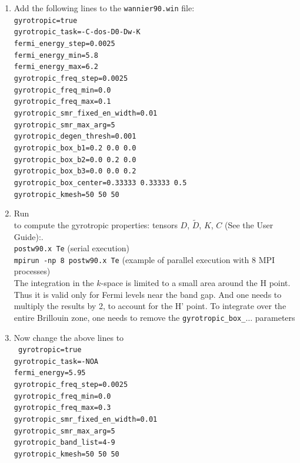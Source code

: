 \documentclass[a4paper,11pt,twoside]{article}
\begin{document}
\begin{enumerate}
\item  Add the following lines to the {\tt wannier90.win} file:\\
{\tt gyrotropic=true  \\
gyrotropic\_task=-C-dos-D0-Dw-K \\
fermi\_energy\_step=0.0025\\
fermi\_energy\_min=5.8\\
fermi\_energy\_max=6.2\\
gyrotropic\_freq\_step=0.0025\\
gyrotropic\_freq\_min=0.0\\
gyrotropic\_freq\_max=0.1\\
gyrotropic\_smr\_fixed\_en\_width=0.01\\
gyrotropic\_smr\_max\_arg=5\\
gyrotropic\_degen\_thresh=0.001\\
gyrotropic\_box\_b1=0.2 0.0 0.0\\
gyrotropic\_box\_b2=0.0 0.2 0.0\\
gyrotropic\_box\_b3=0.0 0.0 0.2\\
gyrotropic\_box\_center=0.33333 0.33333 0.5\\
gyrotropic\_kmesh=50 50 50
}



\item Run \postw\ \\to compute the gyrotropic properties: tensors $D$, $\widetilde{D}$, $K$, $C$ (See the User Guide):.\\
  {\tt postw90.x Te} (serial execution)\\
  {\tt mpirun -np 8 postw90.x Te} (example of parallel execution with
  8 MPI processes) \\


The integration in the $k$-space is limited to a small area around the H point. Thus it is valid only for Fermi levels near the band gap. 
And one needs to multiply the results by 2, to account for the H' point. To integrate over the entire Brillouin zone, one needs to remove the 
{\tt gyrotropic\_box\_$\ldots$} parameters

\item Now change the above lines to \\ {\tt
gyrotropic=true\\
gyrotropic\_task=-NOA\\
fermi\_energy=5.95\\
gyrotropic\_freq\_step=0.0025\\
gyrotropic\_freq\_min=0.0\\
gyrotropic\_freq\_max=0.3\\
gyrotropic\_smr\_fixed\_en\_width=0.01\\
gyrotropic\_smr\_max\_arg=5\\
gyrotropic\_band\_list=4-9\\
gyrotropic\_kmesh=50 50 50\\
}


\end{enumerate}
\end{document}
